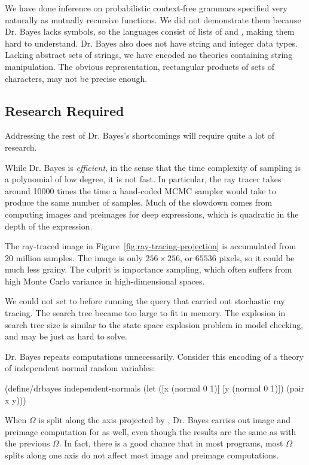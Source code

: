 We have done inference on probabilistic context-free grammars specified very naturally as mutually recursive functions.
We did not demonstrate them because Dr. Bayes lacks symbols, so the languages consist of lists of  and , making them hard to understand.
Dr. Bayes also does not have string and integer data types.
Lacking abstract sets of strings, we have encoded no theories containing string manipulation.
The obvious representation, rectangular products of sets of characters, may not be precise enough.

\subsection{Research Required}

Addressing the rest of Dr. Bayes's shortcomings will require quite a lot of research.

While Dr. Bayes is \emph{efficient}, in the sense that the time complexity of sampling is a polynomial of low degree, it is not fast.
In particular, the ray tracer takes around 10000 times the time a hand-coded MCMC sampler would take to produce the same number of samples.
Much of the slowdown comes from computing images and preimages for deep  expressions, which is quadratic in the depth of the expression.

The ray-traced image in Figure~\ref{fig:ray-tracing-projection} is accumulated from $20$ million samples.
The image is only $256 \times 256$, or $65536$ pixels, so it could be much less grainy.
The culprit is importance sampling, which often suffers from high Monte Carlo variance in high-dimensional spaces.

We could not set  to  before running the query that carried out stochastic ray tracing.
The search tree became too large to fit in memory.
The explosion in search tree size is similar to the state space explosion problem in model checking, and may be just as hard to solve.

Dr. Bayes repeats computations unnecessarily.
Consider this encoding of a theory of independent normal random variables:
\begin{center}\singlespacing
\begin{schemedisplay}
(define/drbayes independent-normals
  (let ([x  (normal 0 1)]
        [y  (normal 0 1)])
    (pair x y)))
\end{schemedisplay}
\end{center}
When $\Omega$ is split along the axis projected by , Dr. Bayes carries out image and preimage computation for  as well, even though the results are the same as with the previous $\Omega$.
In fact, there is a good chance that in most programs, most $\Omega$ splits along one axis do not affect most image and preimage computations.

